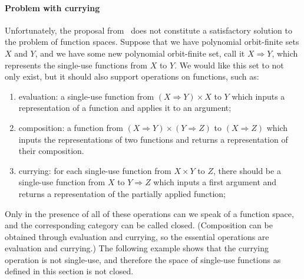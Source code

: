 \paragraph*{Problem with currying}
Unfortunately, the proposal from~\cite{stefanski-phd} does not constitute a satisfactory solution to the problem of function spaces. Suppose that we have polynomial orbit-finite sets $X$ and $Y$, and we have some new polynomial orbit-finite set, call it $X \Rightarrow Y$, which represents the single-use functions from $X$ to $Y$. We would like this set to not only exist, but it should also support operations on functions, such as: 
\begin{enumerate}
    \item evaluation: a single-use function from $(X \Rightarrow Y) \times X$ to $Y$ which inputs a representation of a function and applies it to an argument;
    \item composition: a function from $(X \Rightarrow Y) \times (Y \Rightarrow Z)$ to $(X \Rightarrow Z)$ which inputs the representations of two functions and returns a representation of their composition.
    \item currying: for each single-use function from  $ X \times Y $ to $Z$, there should be a single-use function from $X$ to $Y \Rightarrow Z$ which inputs a first argument and returns a representation of the  partially applied function;
\end{enumerate}
Only in the presence of all of these operations can we speak of a function space, and the corresponding category can be called closed. (Composition can be obtained through evaluation and currying, so the essential operations are evaluation and currying.) The following example shows that the currying operation is not single-use, and therefore the space of single-use functions as defined in this section is not closed. 


